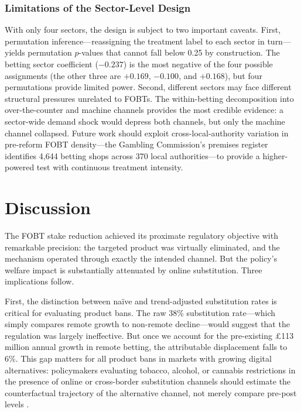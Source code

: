 \documentclass[12pt]{article}
\begin{document}
\subsubsection*{Limitations of the Sector-Level Design} With only four sectors, the design is subject to two important caveats. First, permutation inference---reassigning the treatment label to each sector in turn---yields permutation $p$-values that cannot fall below 0.25 by construction. The betting sector coefficient ($-0.237$) is the most negative of the four possible assignments (the other three are $+0.169$, $-0.100$, and $+0.168$), but four permutations provide limited power. Second, different sectors may face different structural pressures unrelated to FOBTs. The within-betting decomposition into over-the-counter and machine channels provides the most credible evidence: a sector-wide demand shock would depress both channels, but only the machine channel collapsed. Future work should exploit cross-local-authority variation in pre-reform FOBT density---the Gambling Commission's premises register identifies 4,644 betting shops across 370 local authorities---to provide a higher-powered test with continuous treatment intensity.

\section{Discussion}

The FOBT stake reduction achieved its proximate regulatory objective with remarkable precision: the targeted product was virtually eliminated, and the mechanism operated through exactly the intended channel. But the policy's welfare impact is substantially attenuated by online substitution. Three implications follow.

First, the distinction between na\"ive and trend-adjusted substitution rates is critical for evaluating product bans. The raw 38\% substitution rate---which simply compares remote growth to non-remote decline---would suggest that the regulation was largely ineffective. But once we account for the pre-existing \pounds 113 million annual growth in remote betting, the attributable displacement falls to 6\%. This gap matters for all product bans in markets with growing digital alternatives: policymakers evaluating tobacco, alcohol, or cannabis restrictions in the presence of online or cross-border substitution channels should estimate the counterfactual trajectory of the alternative channel, not merely compare pre-post levels \citep{gruber2001tobacco, adda2020taxes}.
\end{document}
